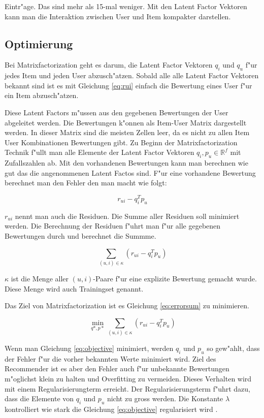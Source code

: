 \documentclass[a4paper, 12pt]{article}
\begin{document}
Eintr"age. Das sind mehr als 15-mal weniger. Mit den Latent Factor Vektoren kann man die Interaktion zwischen User und Item kompakter darstellen.

\subsection{Optimierung}
\label{sec:optim}

Bei Matrixfactorization geht es darum, die Latent Factor Vektoren $q_i$ und $q_u$ f"ur jedes Item und jeden User abzusch"atzen. Sobald alle alle Latent Factor Vektoren bekannt sind ist es mit Gleichung \ref{eq:rui} einfach die Bewertung eines User f"ur ein Item abzusch"atzen.

Diese Latent Factors m"ussen aus den gegebenen Bewertungen der User abgeleitet werden. Die Bewertungen k"onnen als Item-User Matrix dargestellt werden. In dieser Matrix sind die meisten Zellen leer, da es nicht zu allen Item User Kombinationen Bewertungen gibt. Zu Beginn der Matrixfactorization Technik f"ullt man alle Elemente der Latent Factor Vektoren $q_i, p_u \in \mathbb{R}^f$ mit Zufallszahlen ab. Mit den vorhandenen Bewertungen kann man berechnen wie gut das die angenommenen Latent Factos sind. F"ur eine vorhandene Bewertung berechnet man den Fehler den man macht wie folgt:

\begin{equation}
  \label{eq:error}
  r_{ui} - q_i^T p_u
\end{equation}

$r_{ui}$ nennt man auch die Residuen. Die Summe aller Residuen soll minimiert werden.
Die Berechnung der Residuen f"uhrt man f"ur alle gegebenen Bewertungen durch und berechnet die Summme.

\begin{equation}
\label{eq:errorsum}
  \sum_{(u,i) \in \kappa} (r_{ui} - q_i^T p_u)
\end{equation}

$\kappa$ ist die Menge aller $(u,i)$-Paare f"ur eine explizite Bewertung gemacht wurde. Diese Menge wird auch Trainingset genannt.

Das Ziel von Matrixfactorization ist es Gleichung \ref{eq:errorsum} zu minimieren. 

\begin{equation}
  \label{eq:objective}
  \min_{q*,p*} \sum_{(u,i) \in \kappa} (r_{ui} - q_i^T p_u)
\end{equation}

Wenn man Gleichung \ref{eq:objective} minimiert, werden $q_i$ und $p_u$ so gew"ahlt, dass der Fehler f"ur die vorher bekannten Werte minimiert wird. Ziel des Recommender ist es aber den Fehler auch f"ur unbekannte Bewertungen m"oglichst klein zu halten und Overfitting zu vermeiden. Dieses Verhalten wird mit einem Regularisierungterm erreicht. Der Regularisierungsterm f"uhrt dazu, dass die Elemente von $q_i$ und $p_u$ nicht zu gross werden. Die Konstante $\lambda$ kontrolliert wie stark die Gleichung \ref{eq:objective} regularisiert wird \cite{koren2009}.
\end{document}
